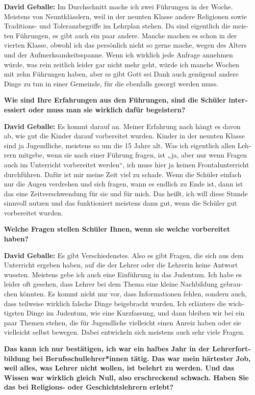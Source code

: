 \begin{otherlanguage}{ngerman}
\textbf{David Geballe:} Im Durchschnitt mache ich zwei Führungen in der Woche. Meistens von Neuntklässlern, weil in der neunten Klasse andere Religionen sowie Traditions- und Toleranzbegriffe im Lehrplan stehen. Da sind eigentlich die meisten Führungen, es gibt auch ein paar andere. Manche machen es schon in der vierten Klasse, obwohl ich das persönlich nicht so gerne mache, wegen des Alters und der Aufmerksamkeitsspanne. Wenn ich wirklich jede Anfrage annehmen würde, was rein zeitlich leider gar nicht mehr geht, würde ich manche Wochen mit zehn Führungen haben, aber es gibt Gott sei Dank auch genügend andere Dinge zu tun in einer Gemeinde, für die ebenfalls gesorgt werden muss. 

\textbf{Wie sind Ihre Erfahrungen aus den Führungen, sind die Schüler interessiert oder muss man sie wirklich dafür begeistern?} 

\textbf{David Geballe:} Es kommt darauf an. Meiner Erfahrung nach hängt es davon ab, wie gut die Kinder darauf vorbereitet wurden. Kinder in der neunten Klasse sind ja Jugendliche, meistens so um die 15 Jahre alt. Was ich eigentlich allen Lehrern mitgebe, wenn sie nach einer Führung fragen, ist „ja, aber nur wenn Fragen auch im Unterricht vorbereitet werden“, ich muss hier ja keinen Frontalunterricht durchführen. Dafür ist mir meine Zeit viel zu schade. Wenn die Schüler einfach nur die Augen verdrehen und sich fragen, wann es endlich zu Ende ist, dann ist das eine Zeitverschwendung für sie und für mich. Das heißt, ich will diese Stunde sinnvoll nutzen und das funktioniert meistens dann gut, wenn die Schüler gut vorbereitet wurden. 

\textbf{Welche Fragen stellen Schüler Ihnen, wenn sie welche vorbereitet haben?} 

\textbf{David Geballe:} Es gibt Verschiedenstes. Also es gibt Fragen, die sich aus dem Unterricht ergeben haben, auf die der Lehrer oder die Lehrerin keine Antwort wussten. Meistens gebe ich auch eine Einführung in das Judentum. Ich habe es leider oft gesehen, dass Lehrer bei dem Thema eine kleine Nachbildung gebrauchen könnten. Es kommt nicht nur vor, dass Informationen fehlen, sondern auch, dass teilweise wirklich falsche Dinge beigebracht wurden. Ich erläutere die wichtigsten Dinge im Judentum, wie eine Kurzfassung, und dann bleiben wir bei ein paar Themen stehen, die für Jugendliche vielleicht einen Anreiz haben oder sie vielleicht selbst bewegen. Dabei entwickeln sich meistens auch sehr viele Fragen. 

\textbf{Das kann ich nur bestätigen, ich war ein halbes Jahr in der Lehrerfortbildung bei Berufsschullehrer*innen tätig. Das war mein härtester Job, weil alles, was Lehrer nicht wollen, ist belehrt zu werden. Und das Wissen war wirklich gleich Null, also erschreckend schwach. Haben Sie das bei Religions- oder Geschichtslehrern erlebt?} 


\end{otherlanguage}
